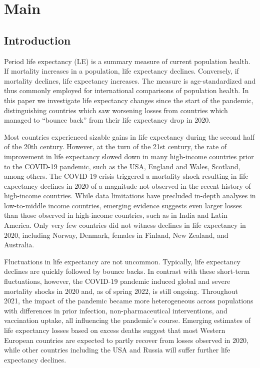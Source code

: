 \documentclass[12pt]{article}
\begin{document}
\section*{Main}

\subsection*{Introduction}

Period life expectancy (LE) is a summary measure of current population health. If mortality increases in a population, life expectancy declines. Conversely, if mortality declines, life expectancy increases. The measure is age-standardized and thus commonly employed for international comparisons of population health.  In this paper we investigate life expectancy changes since the start of the pandemic, distinguishing countries which saw worsening losses from countries which managed to ``bounce back'' from their life expectancy drop in 2020.

Most countries experienced sizable gains in life expectancy during the second half of the 20th century.\cite{Riley2005} However, at the turn of the 21st century, the rate of improvement in life expectancy slowed down in many high-income countries prior to the COVID-19 pandemic,\cite{Raleigh2019} such as the USA,\cite{Ho2018} England and Wales,\cite{Hiam2018} Scotland,\cite{Fenton2019} among others.\cite{Ho2018} The COVID-19 crisis triggered a mortality shock resulting in life expectancy declines in 2020 of a magnitude not observed in the recent history of high-income countries.\cite{Aburto2021b, Islam2021a, Andrasfay2021, Mazzuco2022} While data limitations have precluded in-depth analyses in low-to-middle income countries, emerging evidence suggests even larger losses than those observed in high-income countries, such as in India\cite{Yadav2021} and Latin America.\cite{Castro2021, GarciaGuerrero2021, Lima2021} Only very few countries did not witness declines in life expectancy in 2020, including Norway, Denmark, females in Finland, New Zealand, and Australia.\cite{Aburto2021b, Islam2021a, CanudasRomo2022, Rizzi2021a}

Fluctuations in life expectancy are not uncommon. Typically, life expectancy declines are quickly followed by bounce backs.\cite{Saha2013, Kissler2021} In contrast with these short-term fluctuations, however, the COVID-19 pandemic induced global and severe mortality shocks in 2020 and, as of spring 2022, is still ongoing. Throughout 2021, the impact of the pandemic became more heterogeneous across populations with differences in prior infection, non-pharmaceutical interventions, and vaccination uptake, all influencing the pandemic's course. Emerging estimates of life expectancy losses based on excess deaths suggest that most Western European countries are expected to partly recover from losses observed in 2020, while other countries including the USA and Russia will suffer further life expectancy declines.\cite{Heuveline2022}
\end{document}
